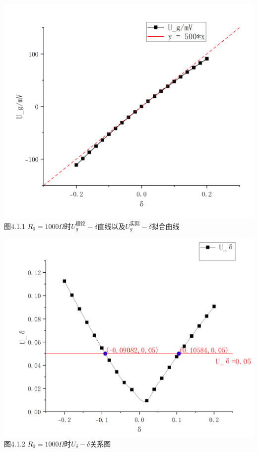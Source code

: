 \documentclass{ctexart}
\begin{document}
    ~\\
    \begin{minipage}[c]{0.5\textwidth}
        \centering \includegraphics[scale=0.4]{1.1.1} \\\small{图4.1.1 $R_0=1000\Omega$时$U_g^{\text{理论}} - \delta$直线以及$U_g^{\text{实际}} - \delta$拟合曲线}
    \end{minipage}
    \begin{minipage}[c]{0.5\textwidth}
        \centering \includegraphics[scale=0.4]{1.1.2} \\\small{图4.1.2 $R_0=1000\Omega$时$U_\delta -\delta $关系图}
    \end{minipage}
    ~\\
\end{document}
